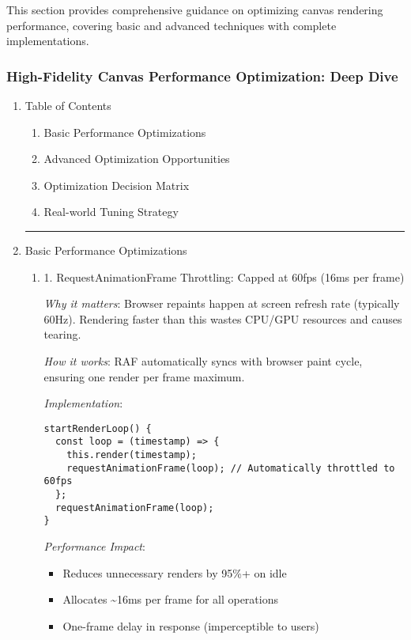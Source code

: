 \documentclass[11pt]{article}
\begin{document}
This section provides comprehensive guidance on optimizing canvas rendering performance, covering basic and advanced techniques with complete implementations.
\subsubsection{High-Fidelity Canvas Performance Optimization: Deep Dive}
\label{sec:org8257c2a}

\begin{enumerate}
\item Table of Contents
\label{sec:orgb0d0d0d}
\begin{enumerate}
\item Basic Performance Optimizations
\item Advanced Optimization Opportunities
\item Optimization Decision Matrix
\item Real-world Tuning Strategy
\end{enumerate}

\noindent\rule{\textwidth}{0.5pt}
\item Basic Performance Optimizations
\label{sec:orgd289b13}

\begin{enumerate}
\item 1. RequestAnimationFrame Throttling: Capped at 60fps (16ms per frame)
\label{sec:orga8174d9}

\emph{Why it matters}: Browser repaints happen at screen refresh rate (typically 60Hz). Rendering faster than this wastes CPU/GPU resources and causes tearing.

\emph{How it works}: RAF automatically syncs with browser paint cycle, ensuring one render per frame maximum.

\emph{Implementation}:
\begin{verbatim}
startRenderLoop() {
  const loop = (timestamp) => {
    this.render(timestamp);
    requestAnimationFrame(loop); // Automatically throttled to 60fps
  };
  requestAnimationFrame(loop);
}
\end{verbatim}

\emph{Performance Impact}:
\begin{itemize}
\item Reduces unnecessary renders by 95\%+ on idle
\item Allocates \textasciitilde{}16ms per frame for all operations
\item One-frame delay in response (imperceptible to users)
\end{itemize}


\end{enumerate}
\end{enumerate}
\end{document}
